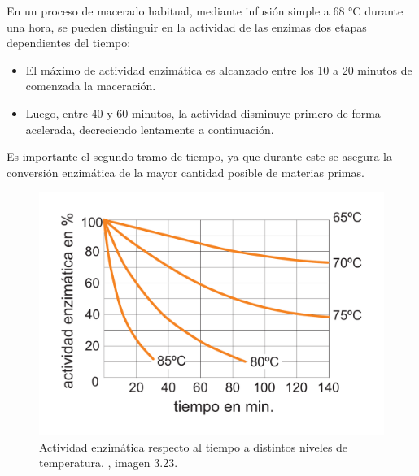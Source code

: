 \begin{itemize}
    	            \par En un proceso de macerado habitual, mediante infusión simple a 68 °C durante una hora, se pueden distinguir en la actividad de las enzimas dos etapas dependientes del tiempo:
    	           
    	            
    	                \begin{itemize}
    	                    \item El máximo de actividad enzimática es alcanzado entre los 10 a 20 minutos de comenzada la maceración.
    	                    
    	                    \item Luego, entre 40 y 60 minutos, la actividad disminuye primero de forma acelerada, decreciendo lentamente a continuación.
    	               
    	                \end{itemize}
    	                
    	           \par Es importante el segundo tramo de tiempo, ya que durante este se asegura la conversión enzimática de la mayor cantidad posible de materias primas.
    	                
    	                \begin{figure} [hb]		                                                       \centerline{\includegraphics[scale=0.4]{duracion_amilasas.pdf}}
		                    \caption{Actividad enzimática respecto al tiempo a distintos niveles de temperatura. \cite{Kunze}, imagen 3.23.}
	                        \label{DuracionEnzimas}
    	                \end{figure}
    	                

\end{itemize}
